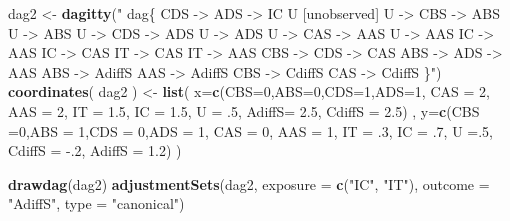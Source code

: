 \documentclass[10pt,dvipsnames,enabledeprecatedfontcommands]{scrartcl}
\newenvironment{Shaded}{\begin{snugshade}}{\end{snugshade}}
\newcommand{\KeywordTok}[1]{\textcolor[rgb]{0.13,0.29,0.53}{\textbf{#1}}}
\newcommand{\DataTypeTok}[1]{\textcolor[rgb]{0.13,0.29,0.53}{#1}}
\newcommand{\DecValTok}[1]{\textcolor[rgb]{0.00,0.00,0.81}{#1}}
\newcommand{\FloatTok}[1]{\textcolor[rgb]{0.00,0.00,0.81}{#1}}
\newcommand{\StringTok}[1]{\textcolor[rgb]{0.31,0.60,0.02}{#1}}
\newcommand{\NormalTok}[1]{#1}
\begin{document}
\begin{Shaded}
\begin{Highlighting}[]
\NormalTok{dag2 <-}\StringTok{ }\KeywordTok{dagitty}\NormalTok{(}\StringTok{"}
\StringTok{  dag\{}
\StringTok{                CDS -> ADS -> IC  }
\StringTok{                U [unobserved]   }
\StringTok{                U -> CBS -> ABS  }
\StringTok{                U -> ABS        }
\StringTok{                U -> CDS -> ADS  }
\StringTok{                U -> ADS         }
\StringTok{                U -> CAS -> AAS    }
\StringTok{                U -> AAS                        }
\StringTok{                IC -> AAS        }
\StringTok{                IC -> CAS        }
\StringTok{                IT -> CAS        }
\StringTok{                IT -> AAS}
\StringTok{                CBS -> CDS -> CAS}
\StringTok{                ABS -> ADS -> AAS}
\StringTok{                ABS -> AdiffS}
\StringTok{                AAS -> AdiffS}
\StringTok{                CBS -> CdiffS}
\StringTok{                CAS -> CdiffS}
\StringTok{                \}"}\NormalTok{)}
\KeywordTok{coordinates}\NormalTok{( dag2 ) <-}\StringTok{ }\KeywordTok{list}\NormalTok{( }\DataTypeTok{x=}\KeywordTok{c}\NormalTok{(}\DataTypeTok{CBS=}\DecValTok{0}\NormalTok{,}\DataTypeTok{ABS=}\DecValTok{0}\NormalTok{,}\DataTypeTok{CDS=}\DecValTok{1}\NormalTok{,}\DataTypeTok{ADS=}\DecValTok{1}\NormalTok{,}
    \DataTypeTok{CAS =} \DecValTok{2}\NormalTok{, }\DataTypeTok{AAS =} \DecValTok{2}\NormalTok{, }\DataTypeTok{IT =} \FloatTok{1.5}\NormalTok{, }\DataTypeTok{IC =} \FloatTok{1.5}\NormalTok{, }\DataTypeTok{U =} \FloatTok{.5}\NormalTok{, }\DataTypeTok{AdiffS=} \FloatTok{2.5}\NormalTok{, }\DataTypeTok{CdiffS =} \FloatTok{2.5}\NormalTok{) ,}
\DataTypeTok{y=}\KeywordTok{c}\NormalTok{(}\DataTypeTok{CBS =}\DecValTok{0}\NormalTok{,}\DataTypeTok{ABS =} \DecValTok{1}\NormalTok{,}\DataTypeTok{CDS =} \DecValTok{0}\NormalTok{,}\DataTypeTok{ADS =} \DecValTok{1}\NormalTok{, }\DataTypeTok{CAS =} \DecValTok{0}\NormalTok{, }\DataTypeTok{AAS =} \DecValTok{1}\NormalTok{, }\DataTypeTok{IT =} \FloatTok{.3}\NormalTok{, }\DataTypeTok{IC =} \FloatTok{.7}\NormalTok{, }\DataTypeTok{U =}\NormalTok{.}\DecValTok{5}\NormalTok{, }\DataTypeTok{CdiffS =} \FloatTok{-.2}\NormalTok{,  }\DataTypeTok{AdiffS =} \FloatTok{1.2}\NormalTok{) )}

\KeywordTok{drawdag}\NormalTok{(dag2)}
\KeywordTok{adjustmentSets}\NormalTok{(dag2, }\DataTypeTok{exposure =} \KeywordTok{c}\NormalTok{(}\StringTok{"IC"}\NormalTok{, }\StringTok{"IT"}\NormalTok{), }\DataTypeTok{outcome =} \StringTok{"AdiffS"}\NormalTok{, }\DataTypeTok{type =} \StringTok{"canonical"}\NormalTok{)}
\end{Highlighting}
\end{Shaded}
\end{document}
